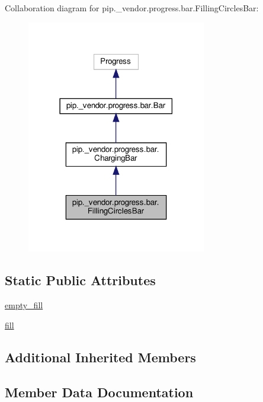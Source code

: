 Collaboration diagram for pip.\+\_\+vendor.\+progress.\+bar.\+Filling\+Circles\+Bar\+:
\nopagebreak
\begin{figure}[H]
\begin{center}
\leavevmode
\includegraphics[width=222pt]{classpip_1_1__vendor_1_1progress_1_1bar_1_1FillingCirclesBar__coll__graph}
\end{center}
\end{figure}
\subsection*{Static Public Attributes}
\begin{DoxyCompactItemize}
\item 
\hyperlink{classpip_1_1__vendor_1_1progress_1_1bar_1_1FillingCirclesBar_a3deb6172addebd79a6fa45faff210dc0}{empty\+\_\+fill}
\item 
\hyperlink{classpip_1_1__vendor_1_1progress_1_1bar_1_1FillingCirclesBar_a614dbc63f5d66cb86f8116c92b815611}{fill}
\end{DoxyCompactItemize}
\subsection*{Additional Inherited Members}


\subsection{Member Data Documentation}
\mbox{\label{classpip_1_1__vendor_1_1progress_1_1bar_1_1FillingCirclesBar_a3deb6172addebd79a6fa45faff210dc0}} 
